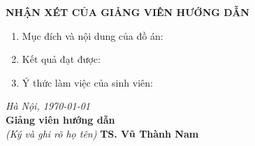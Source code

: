 \begin{center}
    {\bfseries NHẬN XÉT CỦA GIẢNG VIÊN HƯỚNG DẪN}
\end{center}

\begin{enumerate}
    \item Mục đích và nội dung của đồ án:
          \vspace{20ex}
    \item Kết quả đạt được:
          \vspace{20ex}
    \item Ý thức làm việc của sinh viên:
          \vspace{20ex}
\end{enumerate}

\hspace{0.4\textwidth}\begin{minipage}{0.5\textwidth}
    \noindent\begin{center}
        \textit{Hà Nội, \today} \\
        \textbf{Giảng viên hướng dẫn} \\
        \textit{(Ký và ghi rõ họ tên)}
        \vspace{2cm}
        \textbf{TS. Vũ Thành Nam}
    \end{center}
\end{minipage}

\pagestyle{empty}
